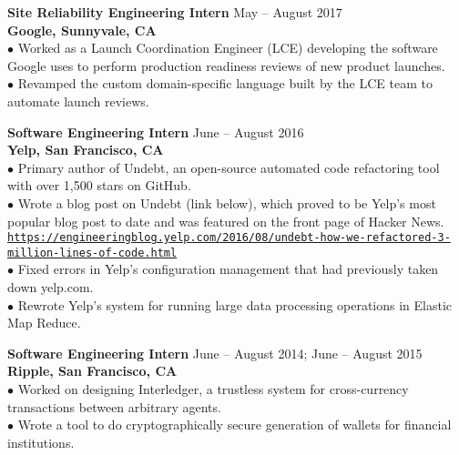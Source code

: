 \documentclass[10pt]{article}
\newcommand{\blankline}{\quad\pagebreak[2]\vspace{-0.3\baselineskip}}
\providecommand*\url[1]{\href{#1}{#1}}
\renewcommand*\url[1]{\href{#1}{\texttt{#1}}}
\begin{document}
\textbf{Site Reliability Engineering Intern}
\hfill May -- August 2017 \\
\textbf{Google, Sunnyvale, CA} \\
$\bullet$ Worked as a Launch Coordination Engineer (LCE) developing the software Google uses to perform production readiness reviews of new product launches. \\
$\bullet$ Revamped the custom domain-specific language built by the LCE team to automate launch reviews.

\blankline

\textbf{Software Engineering Intern}
\hfill June -- August 2016 \\
\textbf{Yelp, San Francisco, CA} \\
$\bullet$ Primary author of Undebt, an open-source automated code refactoring tool with over 1,500 stars on GitHub. \\
$\bullet$ Wrote a blog post on Undebt (link below), which proved to be Yelp's most popular blog post to date and was featured on the front page of Hacker News. \\
\url{https://engineeringblog.yelp.com/2016/08/undebt-how-we-refactored-3-million-lines-of-code.html} \\
$\bullet$ Fixed errors in Yelp's configuration management that had previously taken down yelp.com. \\
$\bullet$ Rewrote Yelp's system for running large data processing operations in Elastic Map Reduce.

\blankline

\textbf{Software Engineering Intern}
\hfill June -- August 2014; June -- August 2015 \\
\textbf{Ripple, San Francisco, CA} \\
$\bullet$ Worked on designing Interledger, a trustless system for cross-currency transactions between arbitrary agents. \\
$\bullet$ Wrote a tool to do cryptographically secure generation of wallets for financial institutions.
\end{document}
